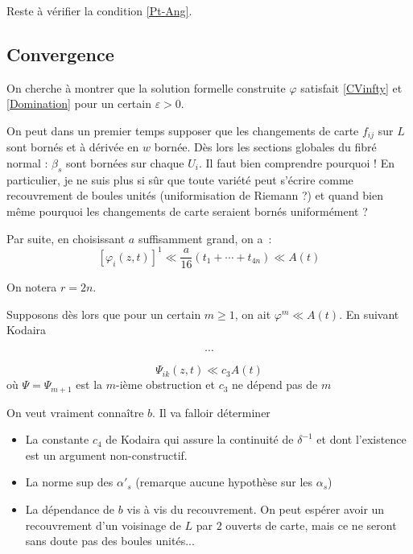 \documentclass[a4paper,10pt,draft,makeidx,twocolumn]{amsart}
\begin{document}
Reste à vérifier la condition \eqref{Pt-Ang}. \excl

\subsection{Convergence}
On cherche à montrer que la solution formelle construite $\varphi$ satisfait \eqref{CVinfty} et \eqref{Domination} pour un certain $\varepsilon>0$.

On peut dans un premier temps supposer que les changements de carte $f_{ij}$ sur $L$ sont bornés et à dérivée en $w$ bornée. Dès lors les sections globales du fibré normal : $\beta_s$ sont bornées sur chaque $U_i$. Il faut bien comprendre pourquoi ! \? En particulier, je ne suis plus si sûr que toute variété peut s'écrire comme recouvrement de boules unités (uniformisation de Riemann ?) et quand bien même pourquoi les changements de carte seraient bornés uniformément ? 

Par suite, en choisissant $a$ suffisamment grand, on a~:
\begin{equation}
\left[\varphi_i(z,t)\right]^1 \ll \dfrac{a}{16}(t_1 + \cdots + t_{4n}) \ll A(t)
\end{equation}

On notera $r = 2n$.

Supposons dès lors que pour un certain $m \geq 1$, on ait $\varphi^m \ll A(t)$. En suivant Kodaira

\[
\cdots
\]

\begin{equation}
\Psi_{ik}(z,t) \ll c_3 A(t)
\end{equation}
où $\Psi =\Psi_{m+1}$ est la $m$-ième obstruction et $c_3$ ne dépend pas de $m$


On veut vraiment connaître $b$. Il va falloir déterminer
\begin{itemize}
\item La constante $c_4$ de Kodaira qui assure la continuité de $\delta^{-1}$ et dont l'existence est un argument non-constructif.
\item La norme sup des $\alpha'_s$ (remarque aucune hypothèse sur les $\alpha_s$)
\item La dépendance de $b$ vis à vis du recouvrement. On peut espérer avoir un recouvrement d'un voisinage de $L$ par $2$ ouverts de carte, mais ce ne seront sans doute pas des boules unités...
\end{itemize}
\end{document}
